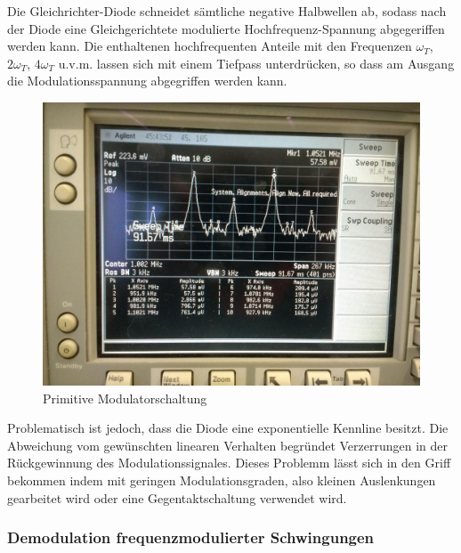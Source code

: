 Die Gleichrichter-Diode schneidet sämtliche negative Halbwellen ab, sodass nach der Diode eine Gleichgerichtete modulierte Hochfrequenz-Spannung abgegeriffen werden kann. Die enthaltenen hochfrequenten Anteile mit den Frequenzen $\omega_T$, $2\omega_T$,
$4\omega_T$ u.v.m. lassen sich mit einem Tiefpass unterdrücken, so dass am Ausgang die Modulationsspannung abgegriffen werden kann.

\begin{figure}
	\centering
	\includegraphics[width=\textwidth]{img/Aufgabenteil_b.jpg}
	\caption{Primitive Modulatorschaltung}
	\label{abb:ringMod}
\end{figure}

Problematisch ist jedoch, dass die Diode eine exponentielle Kennline besitzt. Die Abweichung vom gewünschten linearen Verhalten begründet Verzerrungen in der Rückgewinnung des Modulationssignales. Dieses Problemm lässt sich in den Griff bekommen indem mit geringen Modulationsgraden, also kleinen Auslenkungen gearbeitet wird oder eine Gegentaktschaltung verwendet wird.

\subsubsection{Demodulation frequenzmodulierter Schwingungen}
